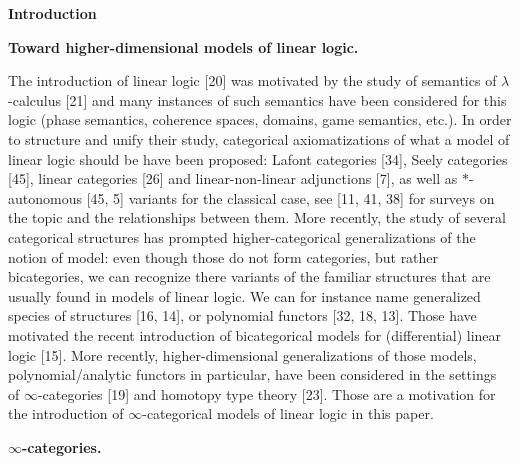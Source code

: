 
 
\par\medskip\noindent\textbf{Introduction}\par
 
 
\par\medskip\noindent\textbf{Toward higher-dimensional models of linear logic.}\par
 
 
The introduction of linear logic [20] was motivated by the study of semantics of $\lambda$-calculus [21] and many instances of such semantics have been considered for this logic (phase semantics, coherence spaces, domains, game semantics, etc.). In order to structure and unify their study, categorical axiomatizations of what a model of linear logic should be have been proposed: Lafont categories [34], Seely categories [45], linear categories [26] and linear-non-linear adjunctions [7], as well as $*$-autonomous [45, 5] variants for the classical case, see [11, 41, 38] for surveys on the topic and the relationships between them. More recently, the study of several categorical structures has prompted higher-categorical generalizations of the notion of model: even though those do not form categories, but rather bicategories, we can recognize there variants of the familiar structures that are usually found in models of linear logic. We can for instance name generalized species of structures [16, 14], or polynomial functors [32, 18, 13]. Those have motivated the recent introduction of bicategorical models for (differential) linear logic [15]. More recently, higher-dimensional generalizations of those models, polynomial/analytic functors in particular, have been considered in the settings of $\infty$-categories [19] and homotopy type theory [23]. Those are a motivation for the introduction of $\infty$-categorical models of linear logic in this paper.\par
 
 
 
 
\par\medskip\noindent\textbf{$\infty$-categories.}\par
 
 
